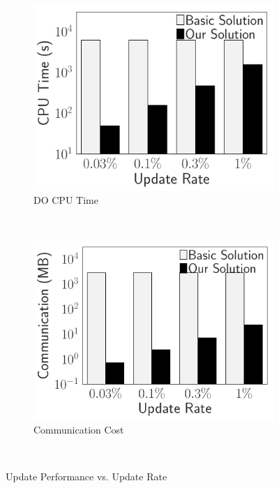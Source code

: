 \begin{figure}[t]
    \centering
    \begin{subfigure}[b]{.4\linewidth}
        \includegraphics[width=\linewidth]{exp-figs/access-control/update_do_time.pdf}
        \caption{DO CPU Time}\label{exp-fig:access-control:update_do_time}
    \end{subfigure}~%
    \begin{subfigure}[b]{.4\linewidth}
        \includegraphics[width=\linewidth]{exp-figs/access-control/update_do_size.pdf}
        \caption{Communication Cost}\label{exp-fig:access-control:update_do_size}
    \end{subfigure}~%
    \caption{Update Performance vs. Update Rate}\label{exp-fig:access-control:update_do}
\end{figure}
